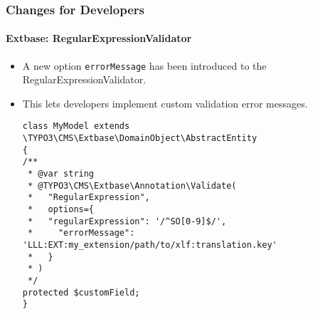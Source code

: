 %

\begin{frame}[fragile]
	\frametitle{Changes for Developers}
	\framesubtitle{Extbase: RegularExpressionValidator}


	\begin{itemize}
		\item A new option \texttt{errorMessage} has been introduced to the RegularExpressionValidator.
		\item This lets developers implement custom validation error messages.
\begin{lstlisting}
class MyModel extends \TYPO3\CMS\Extbase\DomainObject\AbstractEntity
{
/**
 * @var string
 * @TYPO3\CMS\Extbase\Annotation\Validate(
 *   "RegularExpression",
 *   options={
 *   "regularExpression": '/^SO[0-9]$/',
 *     "errorMessage": 'LLL:EXT:my_extension/path/to/xlf:translation.key'
 *   }
 * )
 */
protected $customField;
}
\end{lstlisting}

	\end{itemize}

\end{frame}

